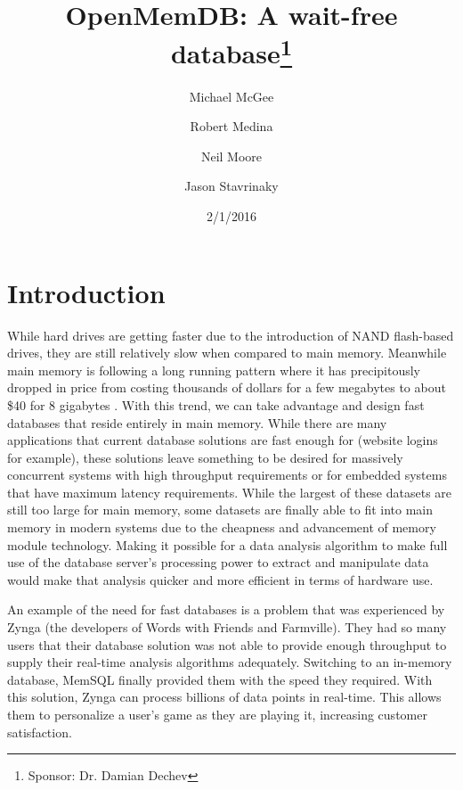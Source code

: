 \documentclass[letter,11pt]{article}
\title{OpenMemDB: A wait-free database\thanks{Sponsor: Dr. Damian Dechev}}
\author{Michael McGee \and Robert Medina \and Neil Moore \and Jason Stavrinaky}
\date{2/1/2016}
\begin{document}
\maketitle
\newpage


\section{Introduction}
While hard drives are getting faster due to the introduction of NAND flash-based drives,
they are still relatively slow when compared to main memory. Meanwhile main memory is 
following a long running pattern where it has precipitously dropped in price from costing 
thousands of dollars for a few megabytes to about \$40 for 8 gigabytes \cite{jcmit}. 
With this trend, we can take advantage and design fast databases that reside entirely in main memory. While there are many 
applications that current database solutions are fast enough for (website logins for 
example), these solutions leave something to be desired for massively concurrent 
systems with high throughput requirements or for embedded systems that have maximum latency 
requirements. While the largest of these datasets are still too large for main memory, 
some datasets are finally able to fit into main memory in modern systems due to the 
cheapness and advancement of memory module technology. Making it possible for a data 
analysis algorithm to make full use of the database server's processing power to extract 
and manipulate data would make that analysis quicker and more efficient in terms of hardware use.
\par\vspace{\baselineskip}
An example of the need for fast databases is a problem that was experienced by Zynga 
(the developers of Words with Friends and Farmville). They had so many users that their 
database solution was not able to provide enough throughput to supply their real-time 
analysis algorithms adequately. Switching to an in-memory database, MemSQL finally 
provided them with the speed they required. With this solution, Zynga can process 
billions of data points in real-time. This allows them to personalize a user's game 
as they are playing it, increasing customer satisfaction.
\end{document}
